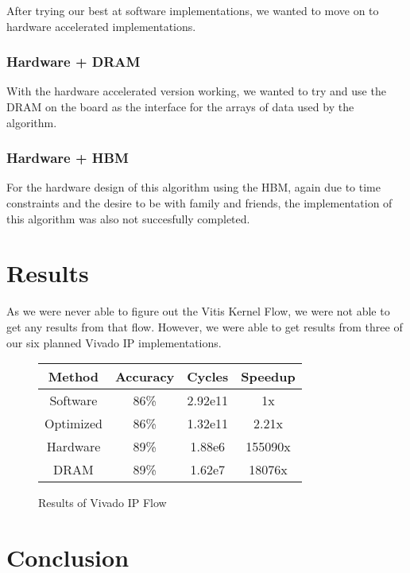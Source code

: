 \documentclass[11pt, final, conference, letterpaper, twocolumn]{IEEEtran}[2015/08/26]
\begin{document}
After trying our best at software implementations, we wanted to move on to hardware accelerated implementations.

\subsubsection{Hardware + DRAM}

With the hardware accelerated version working, we wanted to try and use the DRAM on the board as the interface for the arrays of data used by the algorithm.

\subsubsection{Hardware + HBM}

For the hardware design of this algorithm using the HBM, again due to time constraints and the desire to be with family and friends, the implementation of this algorithm was also not succesfully completed.

\section{Results}
\label{sec:results}

As we were never able to figure out the Vitis Kernel Flow, we were not able to get any results from that flow. However, we were able to get results from three of our six planned Vivado IP implementations.

\begin{figure}
  \centering
  \begin{tabular}{c|ccc}
    \toprule
    Method    & Accuracy & Cycles  & Speedup \\
    \midrule
    Software  & 86\%     & 2.92e11 & 1x      \\
    Optimized & 86\%     & 1.32e11 & 2.21x   \\
    Hardware  & 89\%     & 1.88e6  & 155090x \\
    DRAM      & 89\%     & 1.62e7  & 18076x  \\
    \bottomrule
  \end{tabular}
  \caption{Results of Vivado IP Flow}
  \label{tab:ex:cref}
\end{figure}

\section{Conclusion}
\label{sec:conclusion}
\end{document}
